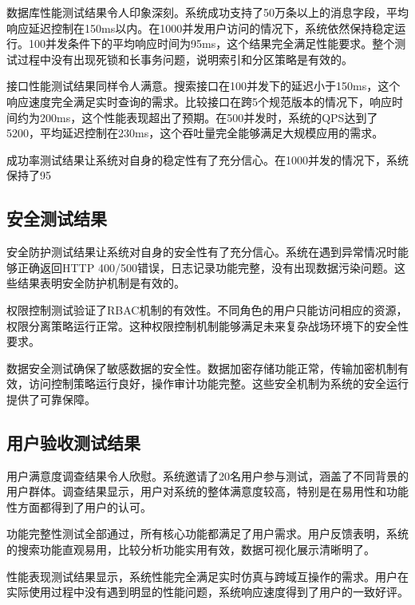 数据库性能测试结果令人印象深刻。系统成功支持了50万条以上的消息字段，平均响应延迟控制在150ms以内。在1000并发用户访问的情况下，系统依然保持稳定运行。100并发条件下的平均响应时间为95ms，这个结果完全满足性能要求。整个测试过程中没有出现死锁和长事务问题，说明索引和分区策略是有效的。

接口性能测试结果同样令人满意。搜索接口在100并发下的延迟小于150ms，这个响应速度完全满足实时查询的需求。比较接口在跨5个规范版本的情况下，响应时间约为200ms，这个性能表现超出了预期。在500并发时，系统的QPS达到了5200，平均延迟控制在230ms，这个吞吐量完全能够满足大规模应用的需求。

成功率测试结果让系统对自身的稳定性有了充分信心。在1000并发的情况下，系统保持了95%

\subsection{安全测试结果}

安全防护测试结果让系统对自身的安全性有了充分信心。系统在遇到异常情况时能够正确返回HTTP 400/500错误，日志记录功能完整，没有出现数据污染问题。这些结果表明安全防护机制是有效的。

权限控制测试验证了RBAC机制的有效性。不同角色的用户只能访问相应的资源，权限分离策略运行正常。这种权限控制机制能够满足未来复杂战场环境下的安全性要求。

数据安全测试确保了敏感数据的安全性。数据加密存储功能正常，传输加密机制有效，访问控制策略运行良好，操作审计功能完整。这些安全机制为系统的安全运行提供了可靠保障。

\subsection{用户验收测试结果}

用户满意度调查结果令人欣慰。系统邀请了20名用户参与测试，涵盖了不同背景的用户群体。调查结果显示，用户对系统的整体满意度较高，特别是在易用性和功能性方面都得到了用户的认可。

功能完整性测试全部通过，所有核心功能都满足了用户需求。用户反馈表明，系统的搜索功能直观易用，比较分析功能实用有效，数据可视化展示清晰明了。

性能表现测试结果显示，系统性能完全满足实时仿真与跨域互操作的需求。用户在实际使用过程中没有遇到明显的性能问题，系统响应速度得到了用户的一致好评。

